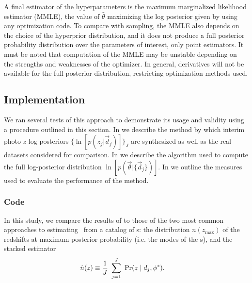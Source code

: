 A final estimator of the hyperparameters is the maximum marginalized likelihood estimator (MMLE), the value of $\hat{\theta}$ maximizing the log posterior given by  using any optimization code.  
To compare with sampling, the MMLE also depends on the choice of the hyperprior distribution, and it does not produce a full posterior probability distribution over the 
parameters of interest, only point estimators.  
It must be noted that computation of the MMLE may be unstable depending on the strengths and weaknesses of the optimizer.  
In general, derivatives will not be available for the full posterior distribution, restricting optimization methods used.

\subsection{Implementation}

We ran several tests of this approach to demonstrate its usage and validity using a procedure outlined in this section.  
In  we describe the method by which interim photo-$z$ log-posteriors $\{\ln[p(z_{j}|\vec{d}_{j})]\}_{J}$ are synthesized as well as the real datasets considered for comparison.  
In  we describe the algorithm used to compute the full log-posterior distribution $\ln[p(\vec{\theta}|\{\vec{d}_{j}\})]$.  
In  we outline the measures used to evaluate the performance of the method.

\subsubsection{Code}

In this study, we compare the results of  to those of the two most common approaches to estimating \nz\ from a catalog of \pzpdf s: the distribution $n(z_{\mathrm{max}})$ of the redshifts at maximum posterior probability (i.e. the modes of the \pzpdf s), and the stacked estimator
\begin{align}
\eqlabel{eqn:stacked}
\hat{n}(z) &\equiv \frac{1}{J}\ \sum_{j=1}^{J}\ \Pr(z \mid d_{j}, \phi^{*}) .
\end{align}

